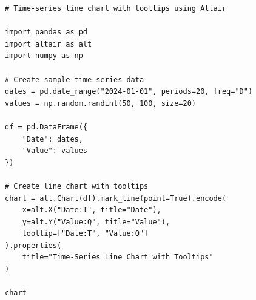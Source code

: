 \begin{verbatim}
# Time-series line chart with tooltips using Altair

import pandas as pd
import altair as alt
import numpy as np

# Create sample time-series data
dates = pd.date_range("2024-01-01", periods=20, freq="D")
values = np.random.randint(50, 100, size=20)

df = pd.DataFrame({
    "Date": dates,
    "Value": values
})

# Create line chart with tooltips
chart = alt.Chart(df).mark_line(point=True).encode(
    x=alt.X("Date:T", title="Date"),
    y=alt.Y("Value:Q", title="Value"),
    tooltip=["Date:T", "Value:Q"]
).properties(
    title="Time-Series Line Chart with Tooltips"
)

chart
\end{verbatim}